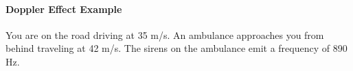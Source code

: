 \documentclass[12pt]{exam}
\begin{document}
\pagestyle{empty}

\paragraph{Doppler Effect Example}
You are on the road driving at 35 m/s.  An ambulance approaches you from behind traveling at 42 m/s.  The sirens on the ambulance emit a frequency of 890 Hz.

\vspace{1em}

\end{document}
